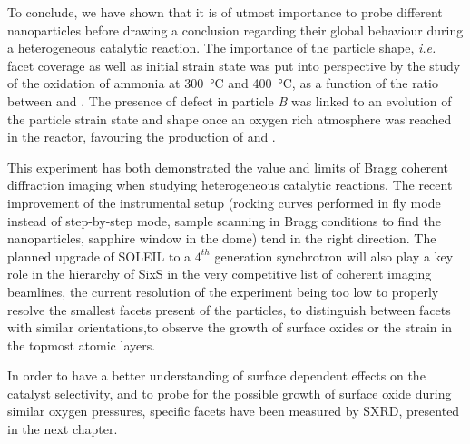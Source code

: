 To conclude, we have shown that it is of utmost importance to probe different nanoparticles before drawing a conclusion regarding their global behaviour during a heterogeneous catalytic reaction.
The importance of the particle shape, \textit{i.e.} facet coverage as well as initial strain state was put into perspective by the study of the oxidation of ammonia at \qty{300}{\degreeCelsius} and \qty{400}{\degreeCelsius}, as a function of the ratio between  and \ammonia.
The presence of defect in particle \textit{B} was linked to an evolution of the particle strain state and shape once an oxygen rich atmosphere was reached in the reactor, favouring the production of  and .

This experiment has both demonstrated the value and limits of Bragg coherent diffraction imaging when studying heterogeneous catalytic reactions.
The recent improvement of the instrumental setup (rocking curves performed in fly mode instead of step-by-step mode, sample scanning in Bragg conditions to find the nanoparticles, sapphire window in the dome) tend in the right direction.
The planned upgrade of SOLEIL to a $4^{th}$ generation synchrotron will also play a key role in the hierarchy of SixS in the very competitive list of coherent imaging beamlines, the current resolution of the experiment being too low to properly resolve the smallest facets present of the particles, to distinguish between facets with similar orientations,to observe the growth of surface oxides or the strain in the topmost atomic layers.

In order to have a better understanding of surface dependent effects on the catalyst selectivity, and to probe for the possible growth of surface oxide during similar oxygen pressures, specific facets have been measured by SXRD, presented in the next chapter.